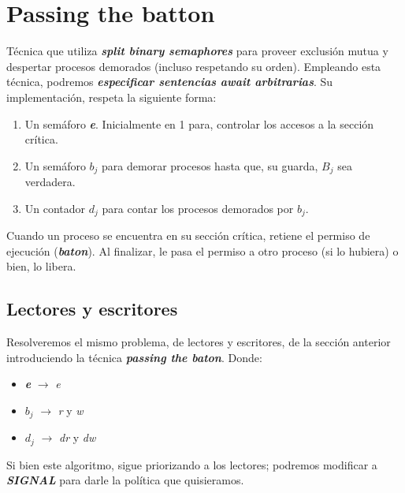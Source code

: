 \documentclass[a4paper, 11pt]{book}
\begin{document}
\section{Passing the batton}

Técnica que utiliza \textbf{\emph{split binary semaphores}} para proveer exclusión mutua y despertar procesos demorados (incluso respetando su orden). Empleando esta técnica, podremos \textbf{\emph{especificar sentencias await arbitrarias}}. Su implementación, respeta la siguiente forma:

\begin{enumerate}
    \item Un semáforo \textbf{\emph{e}}. Inicialmente en 1 para, controlar los accesos a la sección crítica.
    \item Un semáforo \textbf{\emph{$b_j$}} para demorar procesos hasta que, su guarda, \textbf{\emph{$B_j$}} sea verdadera.
    \item Un contador \textbf{\emph{$d_j$}} para contar los procesos demorados por \textbf{\emph{$b_j$}}.
\end{enumerate}

Cuando un proceso se encuentra en su sección crítica, retiene el permiso de ejecución (\textbf{\emph{baton}}). Al finalizar, le pasa el permiso a otro proceso (si lo hubiera) o bien, lo libera.

\subsection{Lectores y escritores}

Resolveremos el mismo problema, de lectores y escritores, de la sección anterior introduciendo la técnica \textbf{\emph{passing the baton}}. Donde:

\begin{itemize}
    \item \textbf{\emph{e}} $\rightarrow$ \emph{e}
    \item \textbf{\emph{$b_j$}} $\rightarrow$ \emph{r} y \emph{w}
    \item \textbf{\emph{$d_j$}} $\rightarrow$ \emph{dr} y \emph{dw}
\end{itemize}

Si bien este algoritmo, sigue priorizando a los lectores; podremos modificar a \textbf{\emph{SIGNAL}} para darle la política que quisieramos.
\end{document}
